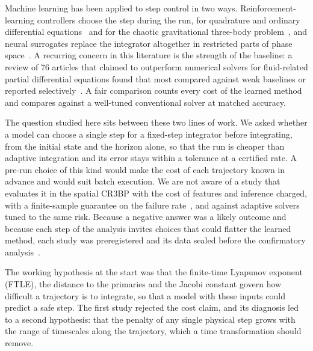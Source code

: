 \documentclass[10pt,letterpaper]{article}
\begin{document}
Machine learning has been applied to step control in two ways. Reinforcement-learning controllers choose the step during the run, for quadrature and ordinary differential equations~\cite{dellnitz2023} and for the chaotic gravitational three-body problem~\cite{sazulibarrena2025}, and neural surrogates replace the integrator altogether in restricted parts of phase space~\cite{breen2020}. A recurring concern in this literature is the strength of the baseline: a review of 76 articles that claimed to outperform numerical solvers for fluid-related partial differential equations found that most compared against weak baselines or reported selectively~\cite{mcgreivy2024}. A fair comparison counts every cost of the learned method and compares against a well-tuned conventional solver at matched accuracy.

The question studied here sits between these two lines of work. We asked whether a model can choose a single step for a fixed-step integrator before integrating, from the initial state and the horizon alone, so that the run is cheaper than adaptive integration and its error stays within a tolerance at a certified rate. A pre-run choice of this kind would make the cost of each trajectory known in advance and would suit batch execution. We are not aware of a study that evaluates it in the spatial CR3BP with the cost of features and inference charged, with a finite-sample guarantee on the failure rate~\cite{angelopoulos2025}, and against adaptive solvers tuned to the same risk. Because a negative answer was a likely outcome and because each step of the analysis invites choices that could flatter the learned method, each study was preregistered and its data sealed before the confirmatory analysis~\cite{nosek2018}.

The working hypothesis at the start was that the finite-time Lyapunov exponent (FTLE), the distance to the primaries and the Jacobi constant govern how difficult a trajectory is to integrate, so that a model with these inputs could predict a safe step. The first study rejected the cost claim, and its diagnosis led to a second hypothesis: that the penalty of any single physical step grows with the range of timescales along the trajectory, which a time transformation should remove.
\end{document}
